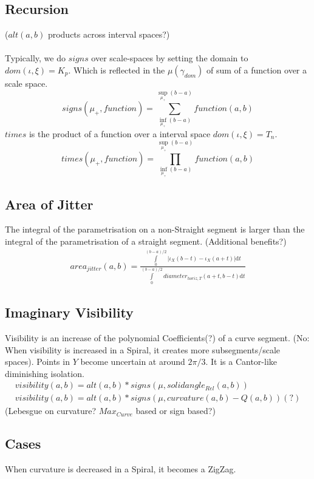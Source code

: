 \documentclass{report}
\begin{document}
\subsection{Recursion}
($alt(a,b)$ products across interval spaces?)\\\\
Typically, we do $signs$ over scale-spaces by setting the domain to $dom(\iota,\xi)=K_{p}$.
Which is reflected in the $\mu(\gamma_{dom})$ of sum of a function over a scale space.\\
\begin{equation}
signs(\mu_{+},function )= \sum \limits _{\inf \limits _{\mu_{+}} (b-a)}^{\sup \limits _{\mu_{+}} (b-a)} function (a,b)
\end{equation}
$times$ is the product of a function over a interval space $dom(\iota,\xi)=T_{n}$.
\begin{equation}
times(\mu_{+},function) = \prod_{\inf \limits _{\mu_{+}} (b-a)}^{\sup \limits _{\mu_{+}} (b-a)} function(a,b)
\end{equation}

\subsection{Area of Jitter}
The integral of the parametrisation on a non-Straight segment is larger than the integral of the parametrisation of a straight segment. (Additional benefits?)
\begin{align}
area_{jitter}(a,b)=\frac{\int \limits _{0}^{(b-a)/2} \lvert \iota_{X}(b-t)-\iota_{X}(a+t)\rvert \mathrm{d}t}{\int \limits _{0}^{(b-a)/2} diameter_{horiz,T}(a+t,b-t)\mathrm{d}t}
\end{align}

\subsection{Imaginary Visibility}
Visibility is an increase of the polynomial Coefficients(?) of a curve segment.
(No: When visibility is increased in a Spiral, it creates more subsegments/scale spaces). Points in $Y$ become uncertain at around $2\pi/3$. It is a Cantor-like diminishing isolation.
\begin{align}
visibility(a,b)= alt(a,b) * signs(\mu,solidangle_{Rel}(a,b))\\
visibility(a,b)= alt(a,b) * signs(\mu,curvature(a,b)-Q(a,b))(?)
\end{align}
(Lebesgue on curvature? $Max_{Curve}$ based or sign based?)
\subsection*{Cases}
When curvature is decreased in a Spiral, it becomes a ZigZag.
\end{document}
